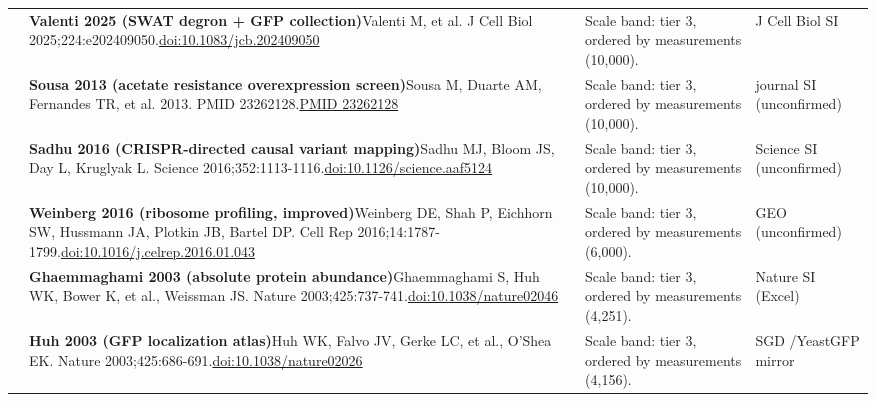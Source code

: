 \begin{landscape}
\begin{longtable}{@{}r@{\hspace{4pt}} L{86mm} L{92mm} L{62mm}@{}}
 & \textbf{Valenti 2025 (SWAT degron + GFP collection)}\newline Valenti M, et al. J Cell Biol 2025;224:e202409050.\newline \href{https://doi.org/10.1083/jcb.202409050}{doi:10.1083/\allowbreak jcb.202409050} & Scale band: tier 3, ordered by measurements (10,000). & J Cell Biol SI \\
 & \textbf{Sousa 2013 (acetate resistance overexpression screen)}\newline Sousa M, Duarte AM, Fernandes TR, et al. 2013. PMID 23262128.\newline \href{https://pubmed.ncbi.nlm.nih.gov/23262128/}{PMID 23262128} & Scale band: tier 3, ordered by measurements (10,000). & journal SI (unconfirmed) \\
 & \textbf{Sadhu 2016 (CRISPR-directed causal variant mapping)}\newline Sadhu MJ, Bloom JS, Day L, Kruglyak L. Science 2016;352:1113-1116.\newline \href{https://doi.org/10.1126/science.aaf5124}{doi:10.1126/\allowbreak science.aaf5124} & Scale band: tier 3, ordered by measurements (10,000). & Science SI (unconfirmed) \\
 & \textbf{Weinberg 2016 (ribosome profiling, improved)}\newline Weinberg DE, Shah P, Eichhorn SW, Hussmann JA, Plotkin JB, Bartel DP. Cell Rep 2016;14:1787-1799.\newline \href{https://doi.org/10.1016/j.celrep.2016.01.043}{doi:10.1016/\allowbreak j.celrep.2016.01.043} & Scale band: tier 3, ordered by measurements (6,000). & GEO (unconfirmed) \\
 & \textbf{Ghaemmaghami 2003 (absolute protein abundance)}\newline Ghaemmaghami S, Huh WK, Bower K, et al., Weissman JS. Nature 2003;425:737-741.\newline \href{https://doi.org/10.1038/nature02046}{doi:10.1038/\allowbreak nature02046} & Scale band: tier 3, ordered by measurements (4,251). & Nature SI (Excel) \\
 & \textbf{Huh 2003 (GFP localization atlas)}\newline Huh WK, Falvo JV, Gerke LC, et al., O'Shea EK. Nature 2003;425:686-691.\newline \href{https://doi.org/10.1038/nature02026}{doi:10.1038/\allowbreak nature02026} & Scale band: tier 3, ordered by measurements (4,156). & SGD /\allowbreak  YeastGFP mirror \\

\end{longtable}
\end{landscape}
